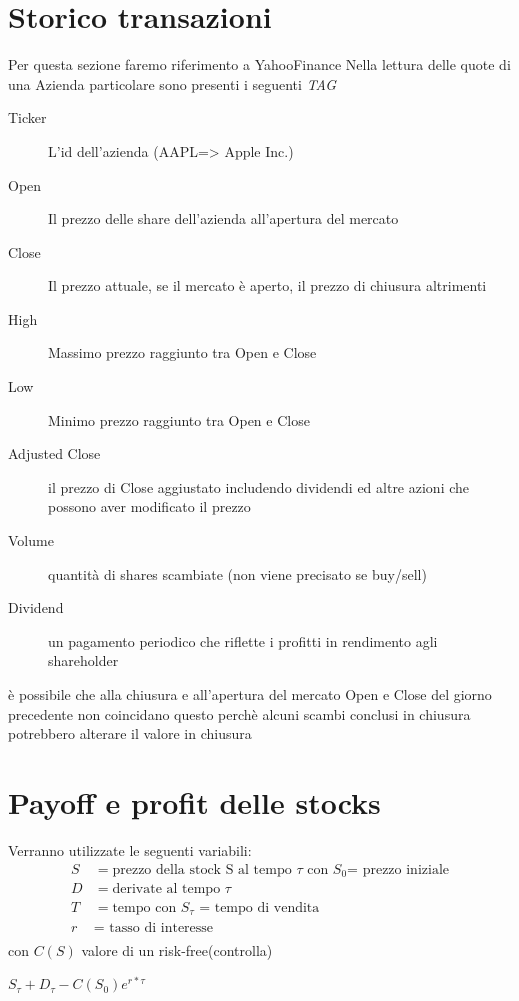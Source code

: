 \documentclass[a4paper,11pt]{report}
\begin{document}
{%

\section{Storico transazioni}
	{\tiny{Per questa sezione faremo riferimento a YahooFinance}} \newline
	Nella lettura delle quote di una Azienda particolare sono presenti i seguenti \emph{TAG} \newline
\begin{description}
	\item[Ticker] L'id dell'azienda (AAPL=> Apple Inc.)
	\item[Open] Il prezzo delle share dell'azienda all'apertura del mercato
	\item[Close] Il prezzo attuale, se il mercato è aperto, il prezzo di chiusura altrimenti
	\item[High] Massimo prezzo raggiunto tra Open e Close
	\item[Low] Minimo prezzo raggiunto tra Open e Close
	\item[Adjusted Close] il prezzo di Close aggiustato includendo dividendi ed altre azioni che possono aver modificato il prezzo
	\item[Volume] quantità di shares scambiate (non viene precisato se buy/sell)
	\item[Dividend] un pagamento periodico che riflette i profitti in rendimento agli shareholder
\end{description}
	è possibile che alla chiusura e all'apertura del mercato Open e Close del giorno precedente non coincidano \newline
	questo perchè alcuni scambi conclusi in chiusura potrebbero alterare il valore in chiusura %
\newpage


\section{Payoff e profit delle stocks}
	Verranno utilizzate le seguenti variabili:
\begin{align*} %
	S &= {\text {prezzo della stock S al tempo $\tau$ con $S_0$= prezzo iniziale}}\\
	D&= {\text {derivate al tempo $\tau$ }}\\
	T &= {\text {tempo con $S_\tau$ = tempo di vendita}}\\
	r &= {\text { tasso di interesse}}\\
\end{align*}
	con $C(S)$ valore di un risk-free(controlla)
\begin{center}
	$S_\tau + D_\tau - C(S_0)e^{r*\tau}$
\end{center}
}
\end{document}
